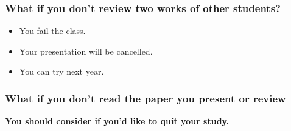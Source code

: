 \begin{frame}
\frametitle{What if you don't review two works of other students?}
\begin{itemize}
\item You fail the class.
\item Your presentation will be cancelled.
\item You can try next year.
\end{itemize}
\end{frame}

\begin{frame}
\frametitle{What if you don't read the paper you present or review}

\textbf{You should consider if you'd like to quit your study.}

\end{frame}
